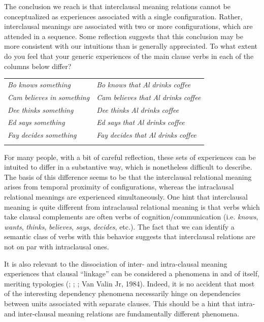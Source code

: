   The conclusion we reach is that interclausal meaning relations cannot be conceptualized as experiences associated with a single configuration. Rather, interclausal meanings are associated with two or more configurations, which are attended in a sequence. Some reflection suggests that this conclusion may be more consistent with our intuitions than is generally appreciated. To what extent do you feel that your generic experiences of the main clause verbs in each of the columns below differ?

\begin{tabularx}{\textwidth}{XX}
\lsptoprule
\textit{Bo} \textit{knows} \textit{something} & \textit{Bo} \textit{knows} \textit{that} \textit{Al} \textit{drinks} \textit{coffee}\\
\textit{Cam} \textit{believes} \textit{in} \textit{something} & \textit{Cam} \textit{believes} \textit{that} \textit{Al} \textit{drinks} \textit{coffee}\\
\textit{Dee} \textit{thinks} \textit{something}  & \textit{Dee} \textit{thinks} \textit{Al} \textit{drinks} \textit{coffee}\\
\textit{Ed} \textit{says} \textit{something} & \textit{Ed} \textit{says} \textit{that} \textit{Al} \textit{drinks} \textit{coffee}\\
\textit{Fay} \textit{decides} \textit{something} & \textit{Fay} \textit{decides} \textit{that} \textit{Al} \textit{drinks} \textit{coffee}\\
\lspbottomrule
\end{tabularx}
  For many people, with a bit of careful reflection, these sets of experiences can be intuited to differ in a substantive way, which is nonetheless difficult to describe. The basis of this difference seems to be that the interclausal relational meaning arises from temporal proximity of configurations, whereas the intraclausal relational meanings are experienced simultaneously. One hint that interclausal meaning is quite different from intraclausal relational meaning is that verbs which take clausal complements are often verbs of cognition/communication (i.e. \textit{knows}, \textit{wants}, \textit{thinks}, \textit{believes}, \textit{says}, \textit{decides}, etc.). The fact that we can identify a semantic class of verbs with this behavior suggests that interclausal relations are not on par with intraclausal ones. 

  It is also relevant to the dissociation of inter- and intra-clausal meaning experiences that clausal “linkage” can be considered a phenomena in and of itself, meriting typologies (\citealt{Bickel2010}; \citealt{Bril2010}; \citealt{Lehmann1988}; Van Valin Jr, 1984). Indeed, it is no accident that most of the interesting dependency phenomena necessarily hinge on dependencies between units associated with separate clauses. This should be a hint that intra- and inter-clausal meaning relations are fundamentally different phenomena.


